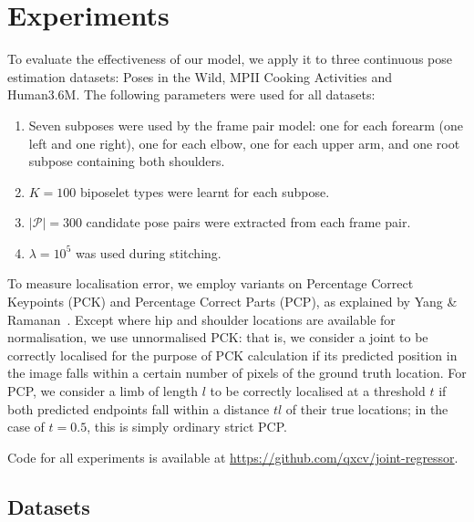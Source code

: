 \documentclass[runningheads]{llncs}
\begin{document}
\section{Experiments}\label{sec:experiments}


To evaluate the effectiveness of our model, we apply it to three continuous pose
estimation datasets: Poses in the Wild, MPII Cooking Activities and Human3.6M.
The following parameters were used for all datasets:

\begin{enumerate}
\item Seven subposes were used by the frame pair model: one for each forearm
(one left and one right), one for each elbow, one for each upper arm, and one
root subpose containing both shoulders.
\item $K = 100$ biposelet types were learnt for each subpose.
\item $|\mathcal P| = 300$ candidate pose pairs were extracted from each frame
pair.
\item $\lambda = 10^5$ was used during stitching.
\end{enumerate}

To measure localisation error, we employ variants on Percentage Correct
Keypoints (PCK) and Percentage Correct Parts (PCP), as explained by Yang \&
Ramanan~\cite{yang2013articulated}. Except where hip and shoulder locations are
available for normalisation, we use unnormalised PCK: that is, we consider a
joint to be correctly localised for the purpose of PCK calculation if its
predicted position in the image falls within a certain number of pixels of the
ground truth location. For PCP, we consider a limb of length $l$ to be correctly
localised at a threshold $t$ if both predicted endpoints fall within a distance
$tl$ of their true locations; in the case of $t = 0.5$, this is simply ordinary
strict PCP.

Code for all experiments is available at \url{https://github.com/qxcv/joint-regressor}.

\subsection{Datasets}
\end{document}
